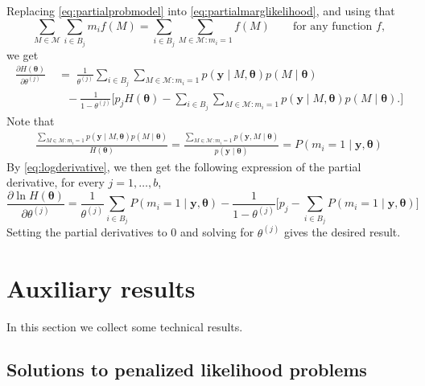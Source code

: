 \documentclass[bj,authoryear]{imsart}
\theoremstyle{plain}
\newcommand{\M}{\mathcal{M}}
\newcommand{\bs}{\boldsymbol}
\begin{document}
    Replacing \eqref{eq:partialprobmodel} into \eqref{eq:partialmarglikelihood}, and using that $$\sum_{M\in \M}\sum_{i\in B_j}m_if(M)=\sum_{i\in B_j}\sum_{M\in \M:m_i=1}f(M)\qquad \mbox{for any function }f,$$ we get
    \begin{align}\label{eq:partialmarglikelihood2}
        \frac{\partial H(\bs \theta)}{\partial \theta^{(j)}}&\;=\;\frac{1}{\theta^{(j)}}\sum_{i \in B_j}\sum_{M\in \M: m_i=1}p(\bs y \mid M,\bs\theta)p(M \mid \bs \theta) \\&\quad- \frac{1}{1-\theta^{(j)}}\bigg[p_j H(\bs \theta)-\sum_{i \in B_j}\sum_{M\in \M: m_i=1}p(\bs y \mid M,\bs\theta)p(M \mid \bs \theta). \nonumber
        \bigg]
    \end{align}
    Note that
    \begin{align*}
        \frac{\sum_{M\in \M: m_i=1}p(\bs y \mid M,\bs\theta)p(M \mid \bs \theta)}{H(\bs \theta)} = \frac{\sum_{M\in \M: m_i=1}p(\bs y , M\mid \bs \theta)}{p(\bs y \mid \bs \theta)}= P(m_i = 1\mid \bs y,\bs \theta)
    \end{align*}
    By \eqref{eq:logderivative}, we then get the following expression of the partial derivative, for every $j=1,\ldots,b$,
    $$\frac{\partial \ln H(\bs \theta)}{\partial \theta^{(j)}}=\frac{1}{\theta^{(j)}}\sum_{i \in B_j}P(m_i = 1\mid \bs y,\bs \theta) - \frac{1}{1-\theta^{(j)}}\bigg[p_j-\sum_{i \in B_j}P(m_i = 1\mid \bs y,\bs \theta)
        \bigg]$$
    Setting the partial derivatives to 0 and solving for $\theta^{(j)}$ gives the desired result.

\section{Auxiliary results}\label{suppsec:auxiliary}

In this section we collect some technical results.

\subsection{Solutions to penalized likelihood problems}
\end{document}
